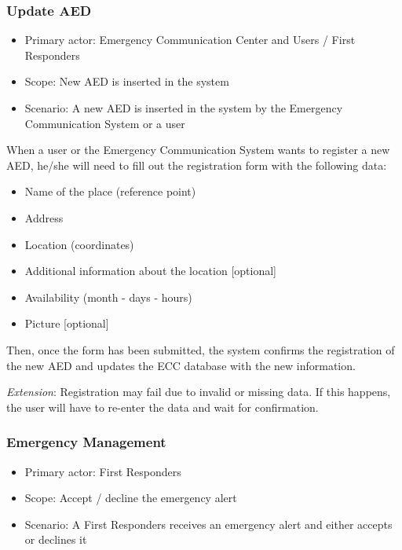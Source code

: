 \documentclass[11pt,a4paper]{article}
\begin{document}
\subsubsection*{Update AED}

\begin{itemize}
    \item Primary actor: Emergency Communication Center and Users / First Responders
    \item Scope: New AED is inserted in the system
    \item Scenario: A new AED is inserted in the system by the Emergency Communication System or a user
\end{itemize}

When a user or the Emergency Communication System wants to register a new AED, he/she will need to fill out the registration form with the following data:

\begin{itemize}
    \item Name of the place (reference point)
    \item Address
    \item Location (coordinates)
    \item Additional information about the location [optional]
    \item Availability (month - days - hours)
    \item Picture [optional]
\end{itemize}

Then, once the form has been submitted, the system confirms the registration of the new AED and updates the ECC database with the new information.

\textit{Extension}: Registration may fail due to invalid or missing data. If this happens, the user will have to re-enter the data and wait for confirmation.

\subsubsection*{Emergency Management}

\begin{itemize}
    \item Primary actor: First Responders
    \item Scope: Accept / decline the emergency alert
    \item Scenario: A First Responders receives an emergency alert and either accepts or declines it
\end{itemize}
\end{document}
